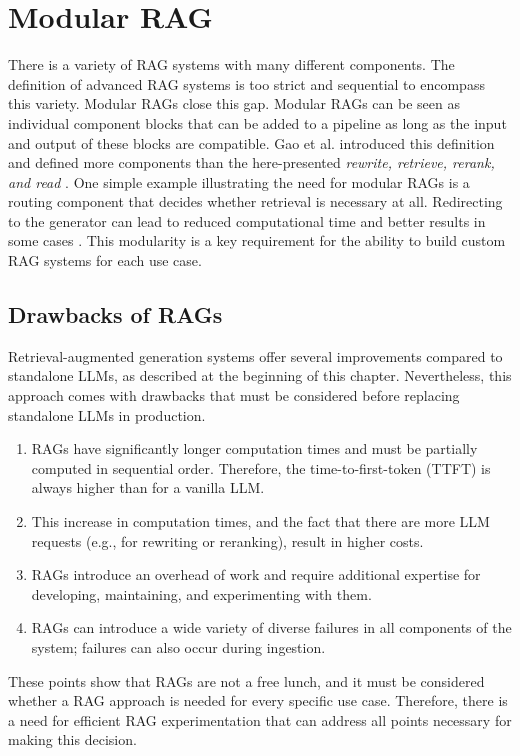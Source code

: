 \section{Modular RAG}

There is a variety of RAG systems with many different components. The definition of advanced RAG systems is too strict and sequential to encompass this variety. Modular RAGs close this gap. Modular RAGs can be seen as individual component blocks that can be added to a pipeline as long as the input and output of these blocks are compatible. Gao et al. introduced this definition and defined more components than the here-presented \textit{rewrite, retrieve, rerank, and read} \cite{Gao.18.12.2023}. One simple example illustrating the need for modular RAGs is a routing component that decides whether retrieval is necessary at all. Redirecting to the generator can lead to reduced computational time and better results in some cases \cite{Mallen.2022}. This modularity is a key requirement for the ability to build custom RAG systems for each use case.


\subsection{Drawbacks of RAGs}
\label{sec:drawbacks}
Retrieval-augmented generation systems offer several improvements compared to standalone LLMs, as described at the beginning of this chapter. Nevertheless, this approach comes with drawbacks that must be considered before replacing standalone LLMs in production.

\begin{enumerate}
    \item RAGs have significantly longer computation times and must be partially computed in sequential order. Therefore, the time-to-first-token (TTFT) is always higher than for a vanilla LLM.
    \item This increase in computation times, and the fact that there are more LLM requests (e.g., for rewriting or reranking), result in higher costs.
    \item RAGs introduce an overhead of work and require additional expertise for developing, maintaining, and experimenting with them.
    \item RAGs can introduce a wide variety of diverse failures in all components of the system; failures can also occur during ingestion.
\end{enumerate}

These points show that RAGs are not a free lunch, and it must be considered whether a RAG approach is needed for every specific use case. Therefore, there is a need for efficient RAG experimentation that can address all points necessary for making this decision.
